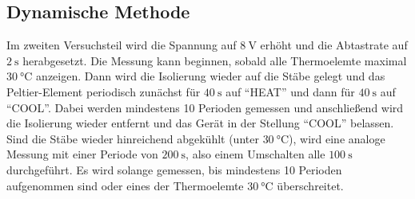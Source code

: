 \subsection{Dynamische Methode}
Im zweiten Versuchsteil wird die Spannung auf $\SI{8}{\volt}$ erhöht und die Abtastrate
auf $\SI{2}{\second}$ herabgesetzt. Die Messung kann beginnen, sobald alle Thermoelemte
maximal $\SI{30}{\celsius}$ anzeigen. Dann wird die Isolierung wieder auf die Stäbe gelegt
und das Peltier-Element periodisch zunächst für $\SI{40}{\second}$ auf “HEAT” und dann
für $\SI{40}{\second}$ auf “COOL”. Dabei werden mindestens 10 Perioden gemessen und anschließend
wird die Isolierung wieder entfernt und das Gerät in der Stellung “COOL” belassen.
\\
\noindent Sind die Stäbe wieder hinreichend abgekühlt (unter $\SI{30}{\celsius}$), wird eine analoge
Messung mit einer Periode von $\SI{200}{\second}$, also einem Umschalten alle $\SI{100}{\second}$
durchgeführt. Es wird solange gemessen, bis mindestens 10 Perioden aufgenommen sind oder eines
der Thermoelemte $\SI{30}{\celsius}$ überschreitet.
